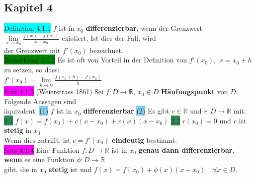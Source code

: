 \documentclass[10pt]{article}
\begin{document}
\subsection*{Kapitel 4}
\colorbox{cyan}{Definition 4.1.1} $f$ ist in $x_0$ \textbf{differenzierbar}, 
                wenn der Grenzwert \textcolor{NavyBlue}{
                $\lim\limits_{x\to x_0}\frac{f(x)-f(x_0)}{x-x_0}$}
                existiert. Ist dies der Fall, wird \\
        \indent der Grenzwert mit \textcolor{NavyBlue}{$f'(x_0)$} bezeichnet.\\
\colorbox{green}{Bemerkung 4.1.2} Es ist oft von Vorteil in der Definition von 
                \textcolor{NavyBlue}{$f'(x_0)$},\,
                \textcolor{NavyBlue}{$x=x_0+h$} zu setzen, so dass: \\
        \indent \textcolor{NavyBlue}{
                $f'(x_0)=\lim\limits_{h\to 0}\frac{f(x_0+h)-f(x_0)}{h}$}\\
\colorbox{magenta}{Satz 4.1.3} (Weierstrass 1861) Sei 
                \textcolor{NavyBlue}{$f:D\longrightarrow\mathbb{R},\,x_0\in D$}
                \textbf{Häufungspunkt} von \textcolor{NavyBlue}{$D$}. 
                Folgende Aussagen sind \\
        \indent äquivalent: 
                \colorbox{SkyBlue}{(1)} \textcolor{NavyBlue}{$f$} ist in 
                \textcolor{NavyBlue}{$x_0$} \textbf{differenzierbar} \qquad
                \colorbox{SkyBlue}{(2)} Es gibt \textcolor{NavyBlue}{$c\in\mathbb{R}$} und 
                \textcolor{NavyBlue}{$r:D\longrightarrow\mathbb{R}$} mit: \\
        \indent\indent \colorbox{SeaGreen}{2.1} 
                \textcolor{NavyBlue}{$f(x)=f(x_0)+c(x-x_0)+r(x)(x-x_0)$} \qquad
                \colorbox{SeaGreen}{2.2} \textcolor{NavyBlue}{$r(x_0)=0$} und 
                \textcolor{NavyBlue}{$r$} ist \textbf{stetig} in \textcolor{NavyBlue}{$x_0$}\\
        \indent Wenn dies zutrifft, ist \textcolor{NavyBlue}{$c=f'(x_0)$} 
                \textbf{eindeutig} bestimmt. \\
\colorbox{magenta}{Satz 4.1.4} Eine Funktion 
                \textcolor{NavyBlue}{$f:D\longrightarrow\mathbb{R}$} ist in 
                $x_0$ \textbf{genau dann differenzierbar, wenn} es eine 
                Funktion \textcolor{NavyBlue}{$\phi:D\longrightarrow\mathbb{R}$}\\
        \indent gibt, die in \textcolor{NavyBlue}{$x_0$} \textbf{stetig} ist 
                und \textcolor{NavyBlue}{$f(x)=f(x_0)+\phi(x)(x-x_0)\quad\forall x\in D$}. 
\end{document}
